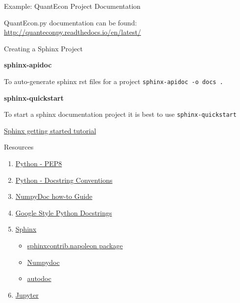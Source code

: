 \documentclass{beamer}
\begin{document}
\begin{frame}{Example: QuantEcon Project Documentation}

QuantEcon.py documentation can be found: \url{http://quanteconpy.readthedocs.io/en/latest/}

\end{frame}

\begin{frame}[fragile]{Creating a Sphinx Project}

\textbf{sphinx-apidoc}

To auto-generate sphinx rst files for a project \texttt{sphinx-apidoc -o docs .} 

\textbf{sphinx-quickstart}

To start a sphinx documentation project it is best to use \texttt{sphinx-quickstart}

\href{http://www.sphinx-doc.org/en/stable/tutorial.html}{Sphinx getting started tutorial}

\end{frame}

\begin{frame}{Resources}
\begin{enumerate}
\item \href{https://www.python.org/dev/peps/pep-0008/}{Python - PEP8}
\item \href{https://www.python.org/dev/peps/pep-0257/}{Python - Docstring Conventions}
\item \href{https://github.com/numpy/numpy/blob/master/doc/HOWTO_DOCUMENT.rst.txt}{NumpyDoc how-to Guide}
\item \href{http://sphinxcontrib-napoleon.readthedocs.io/en/latest/example_google.html}{Google Style Python Docstrings}
\item \href{http://www.sphinx-doc.org/en/stable/}{Sphinx}
\begin{itemize}
  \item \href{http://sphinxcontrib-napoleon.readthedocs.io/en/latest/sphinxcontrib.napoleon.html}{sphinxcontrib.napoleon package}
  \item \href{https://github.com/numpy/numpydoc}{Numpydoc}
  \item \href{http://www.sphinx-doc.org/en/stable/ext/autodoc.html}{autodoc}
\end{itemize}
\item \href{http://jupyter.org/}{Jupyter}
\end{enumerate}
\end{frame}
\end{document}
